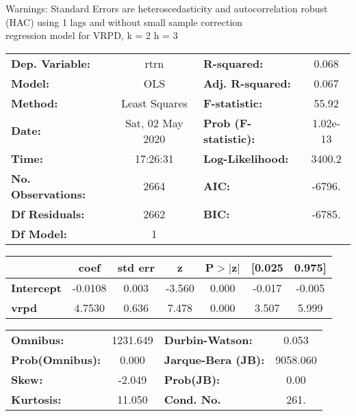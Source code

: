 Warnings: \newline
 [1] Standard Errors are heteroscedasticity and autocorrelation robust (HAC) using 1 lags and without small sample correction\\ 

regression model for VRPD, k = 2 h = 3\begin{center}
\begin{tabular}{lclc}
\toprule
\textbf{Dep. Variable:}    &       rtrn       & \textbf{  R-squared:         } &     0.068   \\
\textbf{Model:}            &       OLS        & \textbf{  Adj. R-squared:    } &     0.067   \\
\textbf{Method:}           &  Least Squares   & \textbf{  F-statistic:       } &     55.92   \\
\textbf{Date:}             & Sat, 02 May 2020 & \textbf{  Prob (F-statistic):} &  1.02e-13   \\
\textbf{Time:}             &     17:26:31     & \textbf{  Log-Likelihood:    } &    3400.2   \\
\textbf{No. Observations:} &        2664      & \textbf{  AIC:               } &    -6796.   \\
\textbf{Df Residuals:}     &        2662      & \textbf{  BIC:               } &    -6785.   \\
\textbf{Df Model:}         &           1      & \textbf{                     } &             \\
\bottomrule
\end{tabular}
\begin{tabular}{lcccccc}
                   & \textbf{coef} & \textbf{std err} & \textbf{z} & \textbf{P$> |$z$|$} & \textbf{[0.025} & \textbf{0.975]}  \\
\midrule
\textbf{Intercept} &      -0.0108  &        0.003     &    -3.560  &         0.000        &       -0.017    &       -0.005     \\
\textbf{vrpd}      &       4.7530  &        0.636     &     7.478  &         0.000        &        3.507    &        5.999     \\
\bottomrule
\end{tabular}
\begin{tabular}{lclc}
\textbf{Omnibus:}       & 1231.649 & \textbf{  Durbin-Watson:     } &    0.053  \\
\textbf{Prob(Omnibus):} &   0.000  & \textbf{  Jarque-Bera (JB):  } & 9058.060  \\
\textbf{Skew:}          &  -2.049  & \textbf{  Prob(JB):          } &     0.00  \\
\textbf{Kurtosis:}      &  11.050  & \textbf{  Cond. No.          } &     261.  \\
\bottomrule
\end{tabular}
\end{center}

